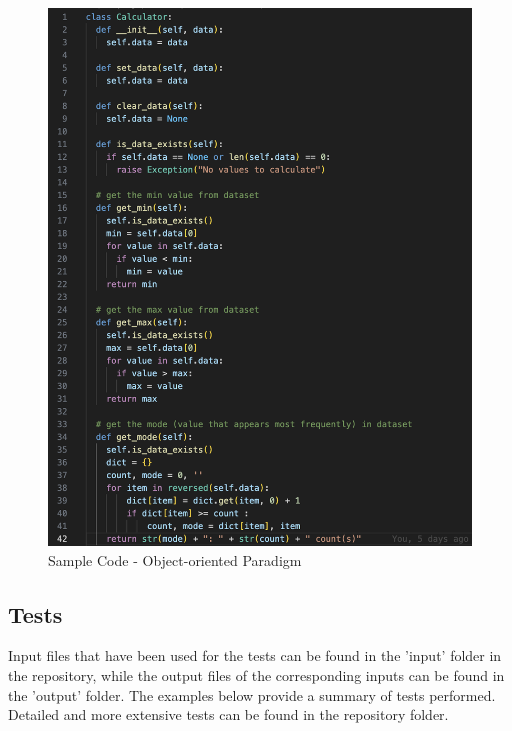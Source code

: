 \begin{figure}
    \begin{center}
    \includegraphics[width=12cm]{images/codesample.png}
    \end{center}
    \caption{Sample Code - Object-oriented Paradigm}
\end{figure}

\pagebreak

\subsection{Tests}
Input files that have been used for the tests can be found in the 'input' folder in the repository, while the output files of the corresponding inputs can be found in the 'output' folder. The examples below provide a summary of tests performed. Detailed and more extensive tests can be found in the repository folder.

